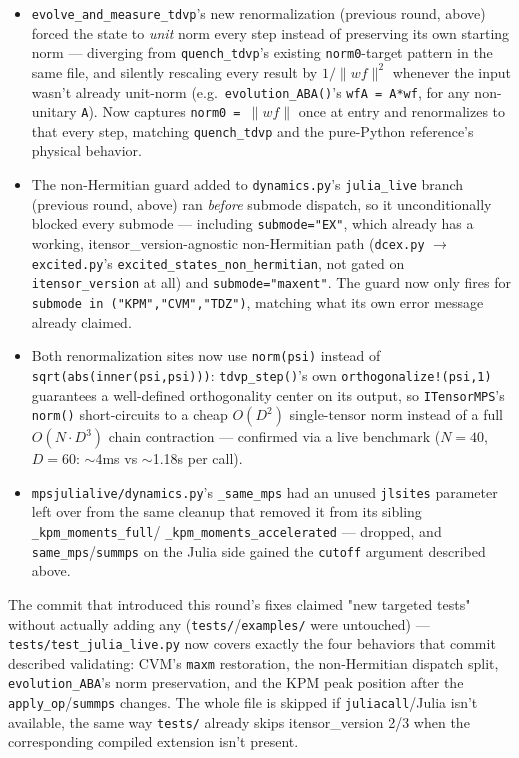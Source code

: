 \documentclass[11pt]{article}
\begin{document}
\begin{itemize}
\item \texttt{evolve\_and\_measure\_tdvp}'s new renormalization (previous
  round, above) forced the state to \emph{unit} norm every step instead
  of preserving its own starting norm --- diverging from
  \texttt{quench\_tdvp}'s existing \texttt{norm0}-target pattern in the
  same file, and silently rescaling every result by $1/\lVert wf\rVert^2$
  whenever the input wasn't already unit-norm (e.g.\
  \texttt{evolution\_ABA()}'s \texttt{wfA = A*wf}, for any non-unitary
  \texttt{A}). Now captures \texttt{norm0 = }$\lVert wf\rVert$ once at
  entry and renormalizes to that every step, matching
  \texttt{quench\_tdvp} and the pure-Python reference's physical
  behavior.
\item The non-Hermitian guard added to \texttt{dynamics.py}'s
  \texttt{julia\_live} branch (previous round, above) ran \emph{before}
  submode dispatch, so it unconditionally blocked every submode ---
  including \texttt{submode="EX"}, which already has a working,
  itensor\_version-agnostic non-Hermitian path (\texttt{dcex.py}
  $\to$ \texttt{excited.py}'s \texttt{excited\_states\_non\_hermitian},
  not gated on \texttt{itensor\_version} at all) and
  \texttt{submode="maxent"}. The guard now only fires for
  \texttt{submode in ("KPM","CVM","TDZ")}, matching what its own error
  message already claimed.
\item Both renormalization sites now use \texttt{norm(psi)} instead of
  \texttt{sqrt(abs(inner(psi,psi)))}: \texttt{tdvp\_step()}'s own
  \texttt{orthogonalize!(psi,1)} guarantees a well-defined orthogonality
  center on its output, so \texttt{ITensorMPS}'s \texttt{norm()}
  short-circuits to a cheap $O(D^2)$ single-tensor norm instead of a full
  $O(N{\cdot}D^3)$ chain contraction --- confirmed via a live benchmark
  ($N=40$, $D=60$: $\sim$4ms vs $\sim$1.18s per call).
\item \texttt{mpsjulialive/dynamics.py}'s \texttt{\_same\_mps} had an
  unused \texttt{jlsites} parameter left over from the same cleanup that
  removed it from its sibling \texttt{\_kpm\_moments\_full}/
  \texttt{\_kpm\_moments\_accelerated} --- dropped, and
  \texttt{same\_mps}/\texttt{summps} on the Julia side gained the
  \texttt{cutoff} argument described above.
\end{itemize}

The commit that introduced this round's fixes claimed "new targeted
tests" without actually adding any (\texttt{tests/}/\texttt{examples/}
were untouched) --- \texttt{tests/test\_julia\_live.py} now covers
exactly the four behaviors that commit described validating: CVM's
\texttt{maxm} restoration, the non-Hermitian dispatch split,
\texttt{evolution\_ABA}'s norm preservation, and the KPM peak position
after the \texttt{apply\_op}/\texttt{summps} changes. The whole file is
skipped if \texttt{juliacall}/Julia isn't available, the same way
\texttt{tests/} already skips itensor\_version 2/3 when the corresponding
compiled extension isn't present.
\end{document}
